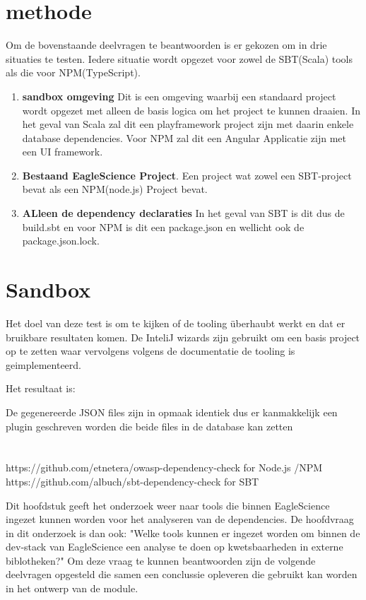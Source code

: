 \section{methode}
Om de bovenstaande deelvragen te beantwoorden is er gekozen om in drie situaties te testen. Iedere situatie wordt opgezet voor zowel de SBT(Scala) tools als die voor NPM(TypeScript).
\begin{enumerate}
    \item \textbf{sandbox omgeving} Dit is een omgeving waarbij een standaard project wordt opgezet met alleen de basis logica om het project te kunnen draaien. In het geval van Scala zal dit een playframework project zijn met daarin enkele database dependencies. Voor NPM zal dit een Angular Applicatie zijn met een UI framework.
    \item \textbf{Bestaand EagleScience Project}. Een project wat zowel een SBT-project bevat als een NPM(node.js) Project bevat.
    \item \textbf{ALleen de dependency declaraties} In het geval van SBT is dit dus de build.sbt en voor NPM is dit  een package.json en wellicht ook de package.json.lock.
\end{enumerate}

\section{Sandbox}
Het doel van deze test is om te kijken of de tooling überhaubt werkt en dat er bruikbare resultaten komen. De InteliJ wizards zijn gebruikt om een basis project op te zetten waar vervolgens volgens de documentatie de tooling is geimplementeerd.

Het resultaat is:

De gegenereerde JSON files zijn in opmaak identiek dus er kanmakkelijk een plugin geschreven worden die beide files in de database kan zetten
\section{}

https://github.com/etnetera/owasp-dependency-check for Node.js /NPM
https://github.com/albuch/sbt-dependency-check for SBT


Dit hoofdstuk geeft het onderzoek weer naar tools die binnen EagleScience ingezet kunnen worden voor het analyseren van de dependencies. De hoofdvraag in dit onderzoek is dan ook: "Welke tools kunnen er ingezet worden om binnen de dev-stack van EagleScience een analyse te doen op kwetsbaarheden in externe biblotheken?" Om deze vraag te kunnen beantwoorden zijn de volgende deelvragen opgesteld die samen een conclussie opleveren die gebruikt kan worden in het ontwerp van de module.



